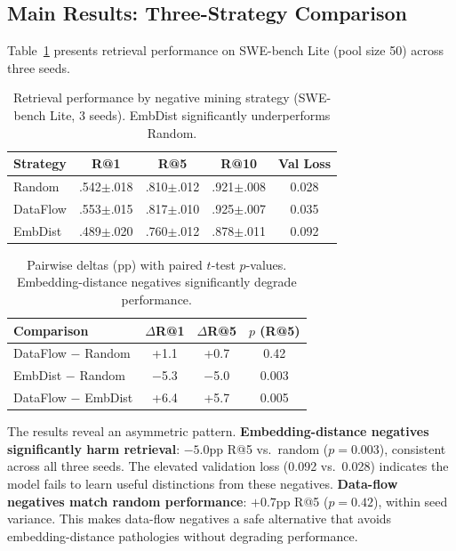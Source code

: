 \documentclass[11pt,a4paper]{article}
\begin{document}
\subsection{Main Results: Three-Strategy Comparison}
\label{sec:main-results}

Table~\ref{tab:main-results} presents retrieval performance on SWE-bench Lite (pool size 50) across three seeds.

\begin{table}[t]
\centering
\small
\begin{tabular}{lcccc}
\toprule
\textbf{Strategy} & \textbf{R@1} & \textbf{R@5} & \textbf{R@10} & \textbf{Val Loss} \\
\midrule
Random & .542{\scriptsize$\pm$.018} & .810{\scriptsize$\pm$.012} & .921{\scriptsize$\pm$.008} & 0.028 \\
DataFlow & .553{\scriptsize$\pm$.015} & .817{\scriptsize$\pm$.010} & .925{\scriptsize$\pm$.007} & 0.035 \\
EmbDist & .489{\scriptsize$\pm$.020} & .760{\scriptsize$\pm$.012} & .878{\scriptsize$\pm$.011} & 0.092 \\
\bottomrule
\end{tabular}
\caption{Retrieval performance by negative mining strategy (SWE-bench Lite, 3 seeds). EmbDist significantly underperforms Random.}
\label{tab:main-results}
\end{table}

\begin{table}[t]
\centering
\small
\begin{tabular}{lccc}
\toprule
\textbf{Comparison} & \textbf{$\Delta$R@1} & \textbf{$\Delta$R@5} & \textbf{$p$ (R@5)} \\
\midrule
DataFlow $-$ Random & +1.1 & +0.7 & 0.42 \\
EmbDist $-$ Random & $-$5.3 & $-$5.0 & 0.003 \\
DataFlow $-$ EmbDist & +6.4 & +5.7 & 0.005 \\
\bottomrule
\end{tabular}
\caption{Pairwise deltas (pp) with paired $t$-test $p$-values. Embedding-distance negatives significantly degrade performance.}
\label{tab:pairwise}
\end{table}

The results reveal an asymmetric pattern.
\textbf{Embedding-distance negatives significantly harm retrieval}: $-5.0$pp R@5 vs.\ random ($p{=}0.003$), consistent across all three seeds.
The elevated validation loss (0.092 vs.\ 0.028) indicates the model fails to learn useful distinctions from these negatives.
\textbf{Data-flow negatives match random performance}: $+0.7$pp R@5 ($p{=}0.42$), within seed variance.
This makes data-flow negatives a safe alternative that avoids embedding-distance pathologies without degrading performance.
\end{document}
